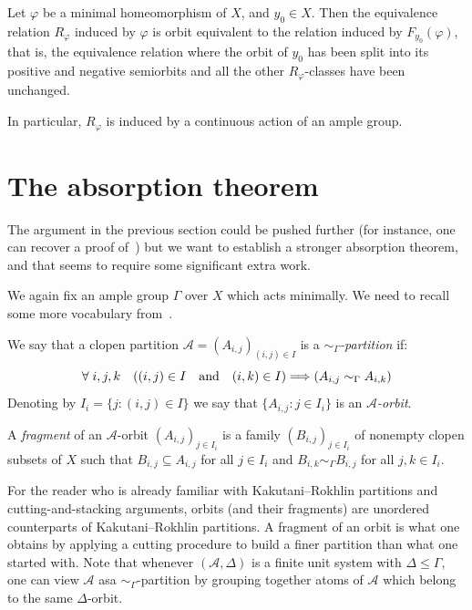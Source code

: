 \documentclass[AHL,Unicode]{cedram}
\newcommand{\mcA}{\mathcal{A}}
\let\oldforall\forall
\renewcommand*{\forall}{\mathrel{\oldforall}}
\newcommand*{\To}{\mathchoice{\Longrightarrow}{\Rightarrow}{\Rightarrow}{\Rightarrow}}
\begin{document}
\begin{theo}
Let $\varphi$ be a minimal homeomorphism of $X$, and $y_0 \in X$. Then the equivalence relation $R_\varphi$ induced by $\varphi$ is orbit equivalent to the relation induced by $F_{y_0}(\varphi)$, that is, the equivalence relation where the orbit of $y_0$ has been split into its positive and negative semiorbits and all the other $R_\varphi$-classes have been unchanged.
\end{theo}

In particular, $R_\varphi$ is induced by a continuous action of an ample group.

\section{The absorption theorem}

The argument in the previous section could be pushed further (for instance, one can recover a proof of~\cite[Theorem~6.4]{Melleray2023}) but we want to establish a stronger absorption theorem, and that seems to require some significant extra work.

We again fix an ample group $\Gamma$ over $X$ which acts minimally. We need to recall some more vocabulary from~\cite{Melleray2023}.

\begin{defi}
We say that a clopen partition $\mcA=(A_{i,j})_{(i,j) \in I}$ is a \emph{$\sim_\Gamma$-partition} if:
\[
\forall i,j,k \quad ((i,j) \in I \quad\text{and}\quad (i,k) \in I) \To (A_{i,j} \sim_\Gamma A_{i,k})
\]
Denoting by $I_i=\{j : (i,j) \in I\}$ we say that $\{A_{i,j} : j \in I_i\}$ is an \emph{$\mcA$-orbit}.

A \emph{fragment} of an $\mcA$-orbit $(A_{i,j})_{j \in I_i}$ is a family $(B_{i,j})_{j \in I_i}$ of nonempty clopen subsets of $X$ such that $B_{i,j} \subseteq A_{i,j}$ for all $j \in I_i$ and $B_{i,k} \sim_\Gamma B_{i,j}$ for all $j,k \in I_i$.
\end{defi}

For the reader who is already familiar with Kakutani--Rokhlin partitions and cutting-and-stacking arguments, orbits (and their fragments) are unordered counterparts of Kakutani--Rokhlin partitions.
A fragment of an orbit is what one obtains by applying a cutting procedure to build a finer partition than what one started with. Note that whenever $(\mcA,\Delta)$ is a finite unit system with $\Delta \le \Gamma$, one can view $\mcA$ as\linebreak a $\sim_\Gamma$-partition by grouping together atoms of $\mcA$ which belong to the same $\Delta$-orbit.
\end{document}
